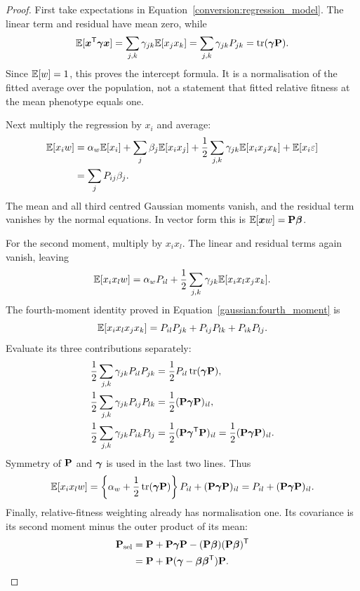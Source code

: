 \begin{proof}
First take expectations in
Equation~\eqref{conversion:regression_model}. The linear term and residual
have mean zero, while
\[
 \mathbb E[\boldsymbol{x}^{\mathsf T}\boldsymbol{\gamma}\boldsymbol{x}]
 =\sum_{j,k}\gamma_{jk}\mathbb E[x_jx_k]
 =\sum_{j,k}\gamma_{jk}P_{jk}
 =\operatorname{tr}(\boldsymbol{\gamma}\mathbf{P}).
\]
Since \(\mathbb E[w]=1\), this proves the intercept formula. It is a normalisation of
the fitted average over the population, not a statement that fitted relative
fitness at the mean phenotype equals one.

Next multiply the regression by \(x_i\) and average:
\begin{align*}
 \mathbb E[x_iw]
 &=\alpha_w\mathbb E[x_i]
   +\sum_j\beta_j\mathbb E[x_ix_j]
   +\frac12\sum_{j,k}\gamma_{jk}\mathbb E[x_ix_jx_k]
   +\mathbb E[x_i\varepsilon]\\
 &=\sum_jP_{ij}\beta_j.
\end{align*}
The mean and all third centred Gaussian moments vanish, and the residual
term vanishes by the normal equations. In vector form this is
\(\mathbb E[\boldsymbol{x}w]=\mathbf{P}\boldsymbol{\beta}\).

For the second moment, multiply by \(x_ix_l\). The linear and residual
terms again vanish, leaving
\[
 \mathbb E[x_ix_lw]
 =\alpha_wP_{il}
   +\frac12\sum_{j,k}\gamma_{jk}\mathbb E[x_ix_lx_jx_k].
\]
The fourth-moment identity proved in
Equation~\eqref{gaussian:fourth_moment} is
\[
 \mathbb E[x_ix_lx_jx_k]
 =P_{il}P_{jk}+P_{ij}P_{lk}+P_{ik}P_{lj}.
\]
Evaluate its three contributions separately:
\begin{align*}
 \frac12\sum_{j,k}\gamma_{jk}P_{il}P_{jk}
 &=\frac12P_{il}\operatorname{tr}(\boldsymbol{\gamma}\mathbf{P}),\\
 \frac12\sum_{j,k}\gamma_{jk}P_{ij}P_{lk}
 &=\frac12(\mathbf{P}\boldsymbol{\gamma}\mathbf{P})_{il},\\
 \frac12\sum_{j,k}\gamma_{jk}P_{ik}P_{lj}
 &=\frac12(\mathbf{P}\boldsymbol{\gamma}^{\mathsf T}\mathbf{P})_{il}
  =\frac12(\mathbf{P}\boldsymbol{\gamma}\mathbf{P})_{il}.
\end{align*}
Symmetry of \(\mathbf{P}\) and \(\boldsymbol{\gamma}\) is used in the last two lines.
Thus
\[
 \mathbb E[x_ix_lw]
 =\left\{\alpha_w+\frac12\operatorname{tr}(\boldsymbol{\gamma}\mathbf{P})\right\}P_{il}
   +(\mathbf{P}\boldsymbol{\gamma}\mathbf{P})_{il}
 =P_{il}+(\mathbf{P}\boldsymbol{\gamma}\mathbf{P})_{il}.
\]
Finally, relative-fitness weighting already has normalisation one.
Its covariance is its second moment minus the outer product of its mean:
\begin{align*}
 \mathbf{P}_{\rm sel}
 &=\mathbf{P}+\mathbf{P}\boldsymbol{\gamma}\mathbf{P}
   -(\mathbf{P}\boldsymbol{\beta})(\mathbf{P}\boldsymbol{\beta})^{\mathsf T}\\
 &=\mathbf{P}+\mathbf{P}
       (\boldsymbol{\gamma}-\boldsymbol{\beta}\boldsymbol{\beta}^{\mathsf T})\mathbf{P}.
\end{align*}
\end{proof}

